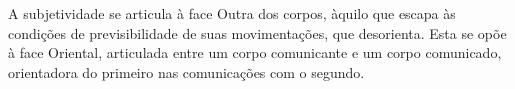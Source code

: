 A subjetividade se articula à face Outra dos corpos, àquilo que escapa às condições de previsibilidade de suas movimentações, que desorienta. Esta se opõe à face Oriental, articulada entre um corpo comunicante e um corpo comunicado, orientadora do primeiro nas comunicações com o segundo.